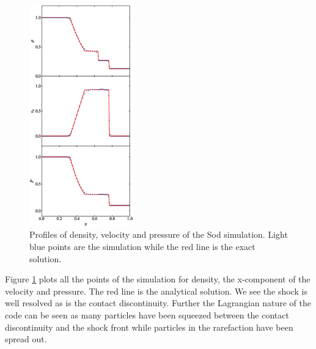\begin{figure}
    \begin{center}
        \includegraphics[width=0.4\textwidth]{figures/sod_2d.eps}
        \caption{Profiles of density, velocity and pressure of the Sod simulation. Light blue points are the simulation
        while the red line is the exact solution.}
        \label{fig.sod}
    \end{center}
\end{figure}
Figure \ref{fig.sod} plots all the points of the simulation for density, the x-component of
the velocity and pressure. The red line is the analytical solution. We see the shock is
well resolved as is the contact discontinuity. Further the Lagrangian nature of the code
can be seen as many particles have been squeezed between the contact discontinuity and the
shock front while particles in the rarefaction have been spread out.

